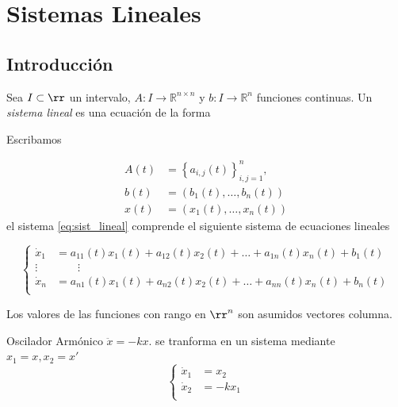 \chapter{Sistemas Lineales }

\section{Introducción}
  
Sea $I\subset\rr$ un intervalo, $A:I \rightarrow \mathbb{R}^{n \times n}$ y $b: I \rightarrow \mathbb{R}^{n}$ funciones continuas. Un \emph{sistema lineal} es una ecuación de la forma


Escribamos

\[
\begin{split} A(t) &=\left\{a_{i,j}(t) \right\}_{i,j=1}^{n}, \\
 b(t)&=(b_1(t),\ldots,b_n(t))\\
 x(t)&=(x_1(t),\ldots,x_n(t))
\end{split}
\]
el sistema \eqref{eq:sist_lineal} comprende el siguiente sistema de ecuaciones lineales



\begin{equation}\left\{
 \begin{split}
 \dot{x}_{1}&=a_{11}(t) x_{1}(t)+a_{12}(t) x_{2}(t)+\ldots+a_{1 n}(t) x_{n}(t)+b_{1}(t)\\
 \vdots &\qquad \vdots\\
  \dot{x}_{n}&=a_{n1}(t) x_{1}(t)+a_{n2}(t) x_{2}(t)+\ldots+a_{n n}(t) x_{n}(t)+b_{n}(t)\\
   \end{split} \right. 
\end{equation}


\begin{observa} Los valores de las funciones con rango en $\rr^n$ son asumidos vectores columna. 
\end{observa}


\begin{ejemplo}{Oscilador Armónico}
$\ddot{x}=-kx$.
se tranforma en un sistema mediante $ x_{1}=x, x_{2}=x'$
\[
\left\{
\begin{split}
\dot{x}_{1}&=x_{2} \\
\dot{x}_{2}&=-k x_{1}\\
\end{split}
\right.
\]
\end{ejemplo}





